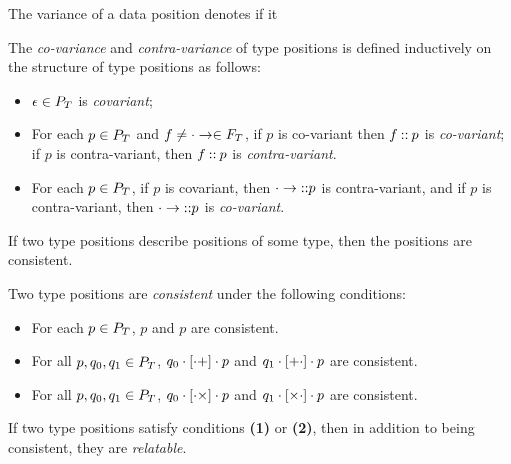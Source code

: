 The variance of a data position denotes if it
%
%
\begin{defn}
  \label{defn:variance}
  The \emph{co-variance} and \emph{contra-variance} of type positions
  is defined inductively on the structure of type positions as
  follows:
  \begin{itemize}
  \item %
    $\epsilon \in P_T$ is \emph{covariant};
  \item %
    For each $p \in P_T$ and
    $f \not= \cdot \to \in F_T$, if $p$ is co-variant then
    $f \mathbin{::} p$ is \emph{co-variant};
    if $p$ is contra-variant, then $f \mathbin{::} p$ is
    \emph{contra-variant}.
  \item %
    For each $p \in P_T$, if $p$ is covariant, then
    $\cdot \to \mathbin{::} p$ is contra-variant, and if $p$ is
    contra-variant, then $\cdot \to \mathbin{::} p$ is \emph{co-variant}.
  \end{itemize}
\end{defn}

If two type positions describe positions of some type, then the
positions are consistent.
%
\begin{defn}
  \label{defn:pos-consistent}
  Two type positions are \emph{consistent} under the following
  conditions:
  \begin{itemize}
  \item %
    For each $p \in P_T$, $p$ and $p$ are consistent.
  \item %
    For all $p, q_0, q_1 \in P_T$,
    $q_0 \cdot [ \cdot + ] \cdot p$ and
    $q_1 \cdot [ + \cdot ] \cdot p$ are consistent.
  \item %
    For all $p, q_0, q_1 \in P_T$,
    $q_0 \cdot [ \cdot \times ] \cdot p$ and
    $q_1 \cdot [ \times \cdot ] \cdot p$ are consistent.
  \end{itemize}
\end{defn}
%
If two type positions satisfy conditions \textbf{(1)} or \textbf{(2)},
then in addition to being consistent, they are \emph{relatable}.
%

